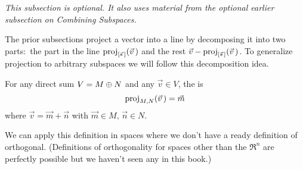 \noindent\textit{This subsection is optional.
     It also uses material from the 
     optional earlier subsection on Combining Subspaces.}

The prior subsections
project a vector into a line by decomposing it into two parts:~the
part in the line $\proj{\vec{v}\,}{\spanof{\vec{s}\,}}$ 
and the rest $\vec{v}-\proj{\vec{v}\,}{\spanof{\vec{s}\,}}$.
To generalize projection to arbitrary subspaces
we will follow this decomposition idea.

\begin{definition}
\label{def:ProjIntoMAlongN}
For any direct sum \( V=M\directsum N \) and any \( \vec{v}\in V \),
the %
is
\begin{equation*}
  \proj{\vec{v}\,}{M,N}=\vec{m}
\end{equation*}
where \( \vec{v}=\vec{m}+\vec{n} \) with \( \vec{m}\in M,\,\vec{n}\in N \).
\end{definition}

We can apply this definition in spaces where we don't have a ready definition
of orthogonal.
(Definitions of orthogonality for spaces other than the $\Re^n$
are perfectly possible but we 
haven't seen any in this book.)

